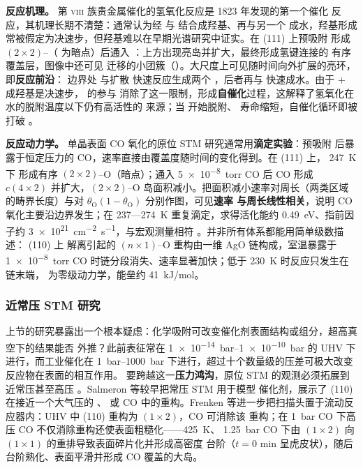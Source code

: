 \textbf{反应机理。} 第 \textsc{viii} 族贵金属催化的氢氧化反应是 1823 年发现的第一个催化
反应，其机理长期不清楚：通常认为经  与  结合成羟基、再与另一个
 成水，羟基形成常被假定为决速步，但羟基难以在早期光谱研究中证实。在
(111) 上预吸附  形成 $(2\times2)$--（ 为暗点）后通入
：上方出现亮岛并扩大，最终形成氢键连接的  有序覆盖层，图像中还可见
迁移的小团簇（）。大尺度上可见随时间向外扩展的亮环，即\textbf{反应前沿}：
边界处  与扩散  快速反应生成两个 ，后者再与
 快速成水。由于 + 成羟基是决速步， 的参与
消除了这一限制，形成\textbf{自催化}过程，这解释了氢氧化在水的脱附温度以下仍有高活性的
来源；当  开始脱附、 寿命缩短，自催化循环即被打破
。

\begin{dataflow}
\textbf{反应动力学。} 单晶表面 CO 氧化的原位 STM 研究通常用\textbf{滴定实验}：预吸附
 后暴露于恒定压力的 CO，速率直接由覆盖度随时间的变化得到。在 (111) 上，
\qty{247}{K} 下  形成有序 $(2\times2)$--O（暗点）；通入 \qty{5e-8}{torr} CO 后
CO 形成 $c(4\times2)$ 并扩大，$(2\times2)$--O 岛面积减小。把面积减小速率对周长（两类区域
的畴界长度）与对 $\theta_{\mathrm{O}}(1-\theta_{\mathrm{O}})$ 分别作图，可见\textbf{速率
与周长线性相关}，说明 CO 氧化主要沿边界发生；在 237—\qty{274}{K} 重复滴定，求得活化能约
\qty{0.49}{eV}、指前因子约 \qty{3e21}{cm^{-2}.s^{-1}}，与宏观测量相符
。并非所有体系都能用简单级数描述：
(110) 上  解离引起的 $(n\times1)$--O 重构由一维 AgO 链构成，室温暴露于
\qty{1e-8}{torr} CO 时链分段消失、速率显著加快；低于 \qty{230}{K} 时反应只发生在链末端，
为零级动力学，能垒约 \qty{41}{kJ/mol}。
\end{dataflow}
\subsubsection{近常压 STM 研究}

上节的研究暴露出一个根本疑虑：化学吸附可改变催化剂表面结构或组分，超高真空下的结果能否
外推？此前表征常在 \qtyrange{1e-14}{1e-10}{bar} 的 UHV 下进行，而工业催化在
\qtyrange{1}{1000}{bar} 下进行，超过十个数量级的压差可极大改变反应物在表面的相互作用。
要跨越这一\textbf{压力鸿沟}，原位 STM 的观测必须拓展到近常压甚至高压
。Salmeron 等较早把常压 STM 用于模型
催化剂，展示了 (110) 在接近一个大气压的 、 或 CO 中的重构。Frenken
等进一步把扫描头置于流动反应器内：UHV 中 (110) 重构为 $(1\times2)$，CO 可消除该
重构；在 \qty{1}{bar} CO 下高压 CO 不仅消除重构还使表面粗糙化——\qty{425}{K}、
\qty{1.25}{bar} CO 下由 $(1\times2)$ 向 $(1\times1)$ 的重排导致表面碎片化并形成高密度
台阶（$t=0$ min 呈虎皮状），随后台阶熟化、表面平滑并形成 CO 覆盖的大岛。

